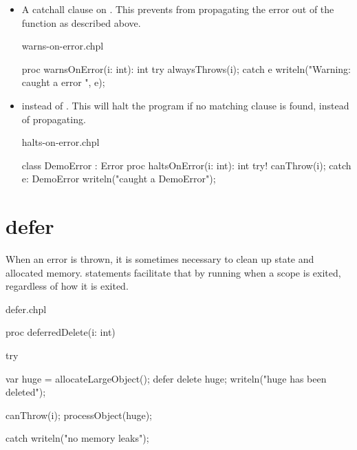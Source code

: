 \begin{itemize}

\item A catchall clause on . This prevents  from
propagating the error out of the function as described above.

\begin{chapelexample}{warns-on-error.chpl}
\begin{chapel}
proc warnsOnError(i: int): int {
  try {
    alwaysThrows(i);
  } catch e {
    writeln("Warning: caught a error ", e);
  }
}
\end{chapel}
\begin{chapelpost}
\end{chapelpost}
\begin{chapeloutput}
\end{chapeloutput}
\end{chapelexample}

\item
{} instead of . This will halt the program if no matching
 clause is found, instead of propagating.

\begin{chapelexample}{halts-on-error.chpl}
\begin{chapel}
class DemoError : Error { }
proc haltsOnError(i: int): int {
  try! {
    canThrow(i);
  } catch e: DemoError {
    writeln("caught a DemoError");
  }
}
\end{chapel}
\begin{chapelpost}
\end{chapelpost}
\begin{chapeloutput}
\end{chapeloutput}
\end{chapelexample}

\end{itemize}

\section{defer}
\label{Errors_defer}

When an error is thrown, it is sometimes necessary to clean up state and
allocated memory.  statements facilitate that by running when a
scope is exited, regardless of how it is exited.

\begin{chapelexample}{defer.chpl}
\begin{chapel}
proc deferredDelete(i: int) {
  try {
    var huge = allocateLargeObject();
    defer {
      delete huge;
      writeln("huge has been deleted");
    }

    canThrow(i);
    processObject(huge);
  } catch {
    writeln("no memory leaks");
  }
}
\end{chapel}
\begin{chapelpost}
\end{chapelpost}
\begin{chapeloutput}
\end{chapeloutput}
\end{chapelexample}


